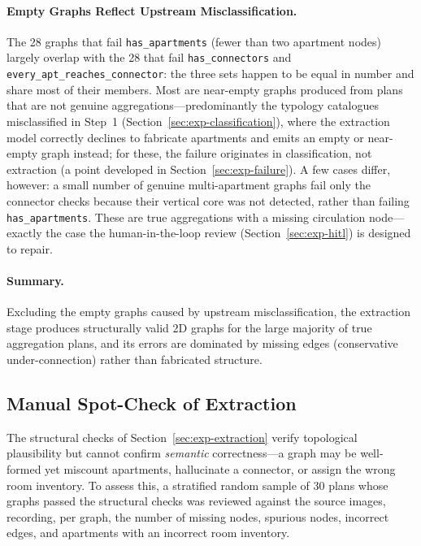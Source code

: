 \documentclass[12pt,a4paper,openright]{report}
\newcommand{\code}[1]{\texttt{#1}}
\begin{document}
\paragraph{Empty Graphs Reflect Upstream Misclassification.} The 28 graphs that fail \code{has\_apartments} (fewer than two apartment nodes) largely overlap with the 28 that fail \code{has\_connectors} and \code{every\_apt\_reaches\_connector}: the three sets happen to be equal in number and share most of their members.
Most are near-empty graphs produced from plans that are not genuine
aggregations---predominantly the typology catalogues misclassified in Step~1 (Section~\ref{sec:exp-classification}), where the extraction model correctly declines to fabricate apartments and emits an empty or near-empty graph instead; for these, the failure originates in classification, not extraction (a point developed in Section~\ref{sec:exp-failure}). A few cases differ, however: a small number of genuine multi-apartment graphs fail only the connector checks because their vertical core was not detected, rather than failing \code{has\_apartments}. These are true aggregations with a missing circulation node---exactly the case the human-in-the-loop review (Section~\ref{sec:exp-hitl}) is designed to repair.

\paragraph{Summary.} Excluding the empty graphs caused by upstream
misclassification, the extraction stage produces structurally valid 2D graphs for the large majority of true aggregation plans, and its errors are dominated by missing edges (conservative under-connection) rather than fabricated structure.

\subsection{Manual Spot-Check of Extraction}
\label{sec:exp-spotcheck}

The structural checks of Section~\ref{sec:exp-extraction} verify topological plausibility but cannot confirm \emph{semantic} correctness---a graph may be well-formed yet miscount apartments, hallucinate a connector, or assign the wrong room inventory. To assess this, a stratified random sample of 30 plans whose graphs passed the structural checks was reviewed against the source images, recording, per graph, the number of missing nodes, spurious nodes,
incorrect edges, and apartments with an incorrect room inventory.
\end{document}
